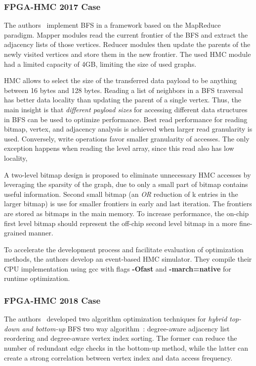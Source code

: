 \documentclass[UTF8,12pt,a4paper]{article}
\begin{document}
\subsubsection{FPGA-HMC 2017 Case}
The authors~\cite{DBLP:conf/fpga/ZhangKL17}
implement BFS in a framework based on the MapReduce paradigm.
Mapper modules read the current frontier of the BFS and extract the adjacency lists of those vertices.
Reducer modules then update the parents of the newly visited vertices and store them in the new frontier.
The used HMC module had a limited capacity of 4GB, limiting the size of used graphs.

HMC allows to select the size of the transferred data payload
to be anything between 16 bytes and 128 bytes.
Reading a list of neighbors in a BFS traversal has better data locality
than updating the parent of a single vertex.
Thus, the main insight is that \textit{different payload sizes}
for accessing different data structures in BFS can be used to optimize performance.
Best read performance for reading bitmap, vertex, and adjacency analysis
is achieved when larger read granularity is used.
Conversely, write operations favor smaller granularity of accesses.
The only exception happens when reading the level array,
since this read also has low locality,

A two-level bitmap design is proposed to eliminate unnecessary HMC accesses
by leveraging the sparsity of the graph,
due to only a small part of bitmap contains useful information.
Second small bitmap (an \textit{OR} reduction of k entries in the larger bitmap)
is use for smaller frontiers in early and last iteration.
The frontiers are stored as bitmaps in the main memory.
To increase performance, the on-chip first level bitmap should
represent the off-chip second level bitmap in a more fine-grained manner.

To accelerate the development process and facilitate evaluation of optimization methods,
the authors develop an event-based HMC simulator.
They compile their CPU implementation using gcc with
flags \textbf{-Ofast} and \textbf{-march=native} for runtime optimization.
\subsubsection{FPGA-HMC 2018 Case}
The authors~\cite{DBLP:conf/fpga/ZhangL18}
developed two algorithm optimization techniques
for \textit{hybrid top-down and bottom-up} BFS two way algorithm~\cite{DBLP:conf/sc/BeamerAP12}:
degree-aware adjacency list reordering and degree-aware vertex index sorting.
The former can reduce the number of redundant edge checks in the bottom-up method,
while the latter can create a strong correlation between vertex index and data access frequency.
\end{document}
